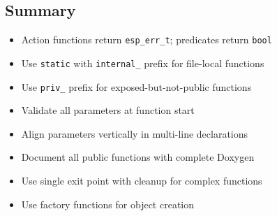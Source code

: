 \subsection{Summary}

\begin{itemize}
    \item Action functions return \texttt{esp\_err\_t}; predicates return \texttt{bool}
    \item Use \texttt{static} with \texttt{internal\_} prefix for file-local functions
    \item Use \texttt{priv\_} prefix for exposed-but-not-public functions
    \item Validate all parameters at function start
    \item Align parameters vertically in multi-line declarations
    \item Document all public functions with complete Doxygen
    \item Use single exit point with cleanup for complex functions
    \item Use factory functions for object creation
\end{itemize}

